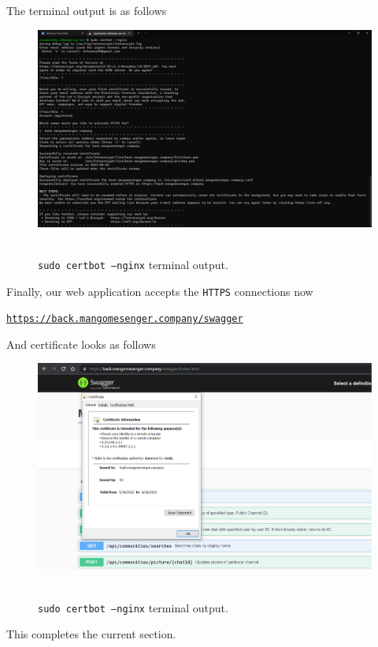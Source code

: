 The terminal output is as follows
\begin{figure}[H]
    \centering
    \includegraphics[width=1\textwidth]{img/07_certbot_nginx}
    ~\caption{\texttt{sudo certbot --nginx} terminal output.}\label{fig:figure22}
\end{figure}

Finally, our web application accepts the \texttt{HTTPS} connections now
\begin{center}
    \href{https://back.mangomesenger.company/swagger}{\texttt{https://back.mangomesenger.company/swagger}}
\end{center}
And certificate looks as follows
\begin{figure}[H]
    \centering
    \includegraphics[width=1\textwidth]{img/07_https_browser_output}
    ~\caption{\texttt{sudo certbot --nginx} terminal output.}\label{fig:figure23}
\end{figure}
This completes the current section.